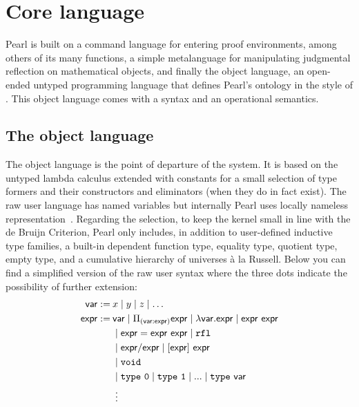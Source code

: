 \documentclass[a4paper]{article}
\begin{document}





\section{Core language} \label{sec:language}

Pearl is built on a command language for entering proof environments, among others of its many functions, a simple metalanguage for manipulating judgmental reflection on mathematical objects, and finally the object language, an open-ended untyped programming language that defines Pearl's ontology in the style of \cite[\S11]{bentzen2026book}. This object language comes with a syntax and an operational semantics. 

\subsection{The object language}

The object language is the point of departure of the system. It is based on the untyped lambda calculus extended with constants for a small selection of type formers and their constructors and eliminators (when they do in fact exist). The raw user language has named variables but internally Pearl uses locally nameless representation~\cite{chargueraud2012locally}. 
Regarding the selection, to keep the kernel small in line with the de Bruijn Criterion, Pearl only includes, in addition to user-defined inductive type families, a built-in dependent function type, equality type, quotient type, empty type, and a cumulative hierarchy of universes à la Russell. Below you can find a simplified version of the raw user syntax where the three dots indicate the possibility of further extension: 
\begin{align*}
	\mathsf{var} :=\:& {x} \mid {y} \mid {z} \mid \ldots \\ 
	\expr :=\:& \var  \mid \Pi_{(\var : \expr)} \expr \mid  \fun{\var}\expr \mid \expr\ \expr \\
	& \mid \idtype{\expr}{\expr}{\expr} \mid  \rfl \\ %
	& \mid \expr / \expr \mid [\expr]\ \expr  \\
	& \mid \void \\ %
	& \mid \type \ \mathtt{0} \mid \type \ \mathtt{1} \mid ... \mid \type \ \var  \\
	& \; \vdots
\end{align*}
\end{document}

